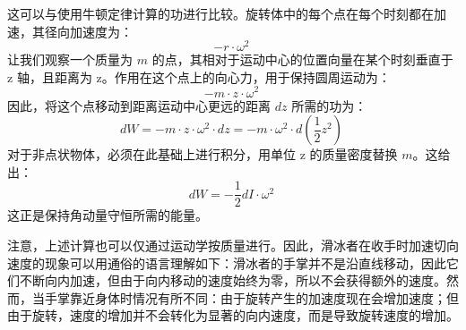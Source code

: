 这可以与使用牛顿定律计算的功进行比较。旋转体中的每个点在每个时刻都在加速，其径向加速度为：
\[
-r \cdot \omega^2~
\]
让我们观察一个质量为 \( m \) 的点，其相对于运动中心的位置向量在某个时刻垂直于 z 轴，且距离为 z。作用在这个点上的向心力，用于保持圆周运动为：
\[
-m \cdot z \cdot \omega^2~
\]
因此，将这个点移动到距离运动中心更远的距离 \( dz \) 所需的功为：
\[
dW = -m \cdot z \cdot \omega^2 \cdot dz = -m \cdot \omega^2 \cdot d\left(\frac{1}{2} z^2\right)~
\]
对于非点状物体，必须在此基础上进行积分，用单位 z 的质量密度替换 \( m \)。这给出：
\[
dW = -\frac{1}{2} dI \cdot \omega^2~
\]
这正是保持角动量守恒所需的能量。

注意，上述计算也可以仅通过运动学按质量进行。因此，滑冰者在收手时加速切向速度的现象可以用通俗的语言理解如下：滑冰者的手掌并不是沿直线移动，因此它们不断向内加速，但由于向内移动的速度始终为零，所以不会获得额外的速度。然而，当手掌靠近身体时情况有所不同：由于旋转产生的加速度现在会增加速度；但由于旋转，速度的增加并不会转化为显著的向内速度，而是导致旋转速度的增加。
